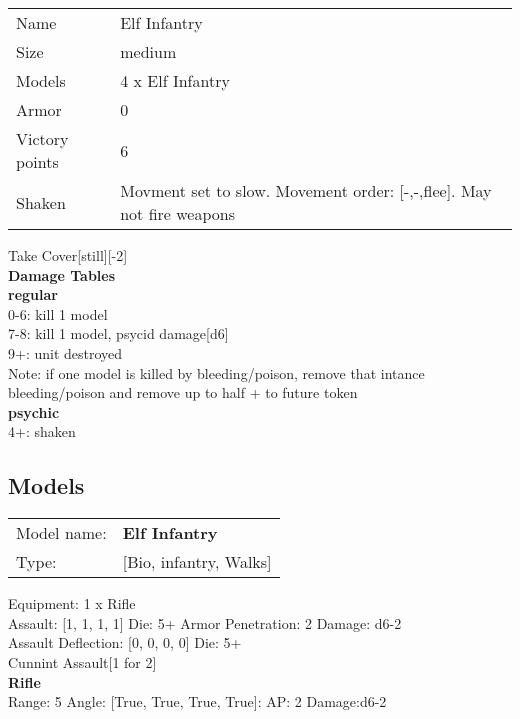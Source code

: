 \begin{tabular}{ll}
  Name & Elf Infantry \\
  Size & medium\\
  Models & 4 x Elf Infantry\\
  Armor & 0\\
  Victory points & 6\\
  Shaken & Movment set to slow. Movement order: [-,-,flee]. May not fire weapons\\
\end{tabular}

Take Cover[still][-2]\\ 



{\bf Damage Tables} \\
 {\bf regular } \\
0-6: kill 1 model \\
7-8: kill 1 model, psycid damage[d6] \\
9+: unit destroyed \\
Note: if one model is killed by bleeding/poison, remove that intance \\ bleeding/poison and remove up to half + to future token \\
 {\bf psychic } \\
4+: shaken \\


\pagebreak

\subsection{ Models }

\begin{tabular}{ll}
Model name: & {\bf Elf Infantry } \\
Type: & [Bio, infantry, Walks] \\
\end{tabular}

Equipment: 1 x Rifle \\

Assault: [1, 1, 1, 1] Die: 5+ Armor Penetration: 2 Damage: d6-2 \\
Assault Deflection: [0, 0, 0, 0] Die: 5+\\
\indent Cunnint Assault[1 for 2]\\ 
 



{\bf Rifle } \\



Range: 5  Angle: [True, True, True, True]: AP: 2 Damage:d6-2 \\




 















\pagebreak